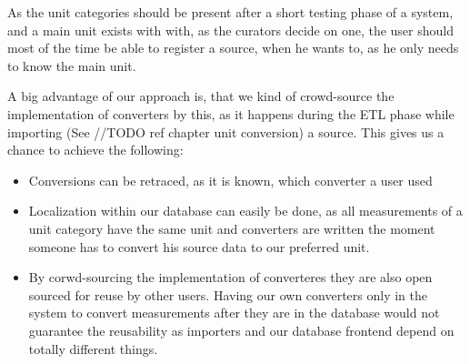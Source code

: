 As the unit categories should be present after a short testing phase of
a system, and a main unit exists with with, as the curators decide on
one, the user should most of the time be able to register a source, when
he wants to, as he only needs to know the main unit.

A big advantage of our approach is, that we kind of crowd-source the
implementation of converters by this, as it happens during the ETL phase
while importing (See //TODO ref chapter unit conversion) a source. This
gives us a chance to achieve the following:

\begin{itemize}
	\item
	Conversions can be retraced, as it is known, which converter a user
	used
	\item
	Localization within our database can easily be done, as all
	measurements of a unit category have the same unit and converters are
	written the moment someone has to convert his source data to our
	preferred unit.
	\item
	By corwd-sourcing the implementation of converteres they are also open
	sourced for reuse by other users. Having our own converters only in
	the system to convert measurements after they are in the database
	would not guarantee the reusability as importers and our database
	frontend depend on totally different things.
\end{itemize}
